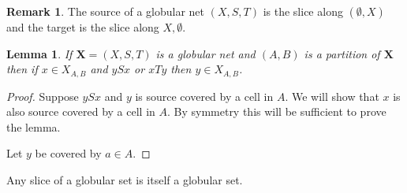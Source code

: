 \documentclass[draft]{article}
\newtheorem{lemma}[theorem]{Lemma} \theoremstyle{definition}
\newtheorem{remark}{Remark} \newtheorem*{claim}{Claim}
\newcommand*{\X}{\ensuremath{\mathbf{X}}}
\begin{document}
\begin{remark}
  The source of a globular net \((X,S,T)\) is the slice along \((\emptyset,X)\) and the target is the slice along \(X,\emptyset\).
\end{remark}

\begin{lemma}
  If \(\X = (X,S,T)\) is a globular net and \((A,B)\) is a partition of \(\X\) then if \(x \in X_{A,B}\) and \(ySx\) or \(xTy\) then \(y \in X_{A,B}\).
\end{lemma}
\begin{proof}
  Suppose \(ySx\) and \(y\) is source covered by a cell in \(A\). We will show that \(x\) is also source covered by a cell in \(A\). By symmetry this will be sufficient to prove the lemma.

  Let \(y\) be covered by \(a \in A\).
\end{proof}

\begin{prop}
  Any slice of a globular set is itself a globular set.
\end{prop}
\end{document}
